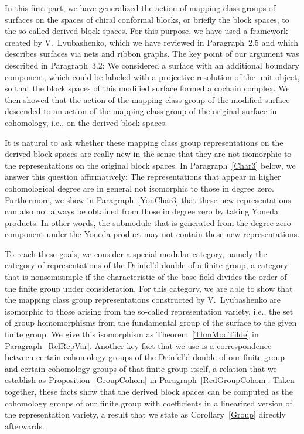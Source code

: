 \documentclass[12pt]{article}
\theoremstyle{definition}
\theoremstyle{break}
\renewcommand{\1}{\mathbbm{1}}
\begin{document}
In this first part, we have generalized the action of mapping class groups of surfaces on the spaces of chiral conformal blocks, or briefly the block spaces, to the so-called derived block spaces. For this purpose, we have used a framework created by V.~Lyubashenko, which we have reviewed in Paragraph~2.5 and which describes surfaces via nets and ribbon graphs. The key point of our argument was described in Paragraph~3.2: We considered a surface with an additional boundary component, which could be labeled with a projective resolution of the unit object,
so that the block spaces of this modified surface formed a cochain complex.
We then showed that the action of the mapping class group of the modified surface descended to an action of the mapping class group of the original surface in cohomology, i.e., on the derived block spaces.

It is natural to ask whether these mapping class group representations on the derived block spaces are really new in the sense that they are not isomorphic to the representations on the original block spaces. In Paragraph~\ref{Char3} below, we answer this question affirmatively: The representations that appear in higher cohomological degree are in general not isomorphic to those in degree zero. Furthermore, we show in Paragraph~\ref{YonChar3} that these new representations can also not always be obtained from those in degree zero by taking Yoneda products. In other words, the submodule that is generated from the degree zero component under the Yoneda product may not contain these new representations.

To reach these goals, we consider a special modular category, namely the category of representations of the Drinfel'd double of a finite group, a category that is nonsemisimple if the characteristic of the base field divides the order of the finite group under consideration. For this category, we are able to show that the mapping class group representations constructed by V.~Lyubashenko are isomorphic to those arising from the so-called representation variety, i.e., the set of group homomorphisms from the fundamental group of the surface to the given finite group. We give this isomorphism as Theorem~\ref{ThmModTilde} in Paragraph~\ref{RelRepVar}. Another key fact that we use is a correspondence between certain cohomology groups of the Drinfel'd double of our finite group and certain cohomology groups of that finite group itself, a relation that we establish as Proposition~\ref{GroupCohom} in Paragraph~\ref{RedGroupCohom}. Taken together, these facts show that the derived block spaces can be computed as the cohomology groups of our finite group with coefficients in a linearized version of the representation variety, a result that we state as Corollary~\ref{Group} directly afterwards.
\end{document}
